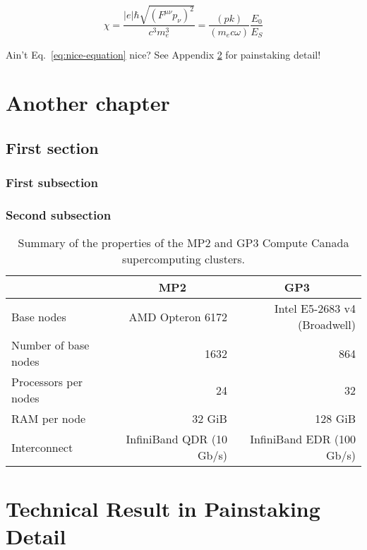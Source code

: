 \documentclass[11pt,SymmetricalJury,PhD]{inrsthesis}
\begin{document}
\lipsum[3]

  \begin{equation}
    \label{eq:nice-equation}
    \chi = \frac{|e|\hbar\sqrt{\left(F^{\mu\nu}p_\nu\right)^2}}{c^3m_e^3} = \frac{(pk)}{(m_e c\omega)}\frac{E_0}{E_S}
  \end{equation}

Ain't Eq.~\eqref{eq:nice-equation} nice? See Appendix \ref{app.technical} for
painstaking detail!

\chapter{Another chapter}
\label{chapter:methods}


\section{First section}

\subsection{First subsection}

\subsection{Second subsection}


\begin{table}
  \centering
  \begin{tabular}{lrr}
  \toprule
                       & \multicolumn{1}{c}{MP2}   & \multicolumn{1}{c}{GP3}      \\
  \midrule
  Base nodes           & AMD Opteron 6172          & Intel E5-2683 v4 (Broadwell) \\
  Number of base nodes & 1632                      & 864                          \\
  Processors per nodes & 24                        & 32                           \\
  RAM per node         & 32 GiB                    & 128 GiB                      \\
  Interconnect         & InfiniBand QDR (10 Gb/s)  & InfiniBand EDR (100 Gb/s)    \\
  \bottomrule
  \end{tabular}
  \caption{Summary of the properties of the MP2 and GP3 Compute Canada supercomputing clusters.}
  \label{tab:summary-of-cc-clusters}
\end{table}


\appendix
{}
\renewcommand{\thechapter}{\Alph{chapter}}
\renewcommand{\thesection}{\Alph{chapter}.\arabic{section}}

\chapter{Technical Result in Painstaking Detail}
\label{app.technical}


\backmatter

\nocite{*}


\end{document}
